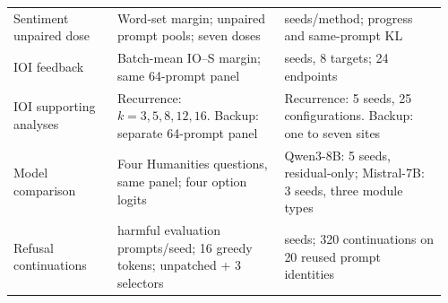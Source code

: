 \begin{longtable}{@{}>{\raggedright\arraybackslash}p{0.23\linewidth}>{\raggedright\arraybackslash}p{0.37\linewidth}>{\raggedright\arraybackslash}p{0.36\linewidth}@{}}
Sentiment unpaired dose & Word-set margin; unpaired prompt pools; seven doses & 3 seeds/method; progress and same-prompt KL \\
IOI feedback & Batch-mean IO--S margin; same 64-prompt panel & 3 seeds, 8 targets; 24 endpoints \\
IOI supporting analyses & Recurrence: $k=3,5,8,12,16$. Backup: separate 64-prompt panel & Recurrence: 5 seeds, 25 configurations. Backup: one to seven sites \\
Model comparison & Four Humanities questions, same panel; four option logits & Qwen3-8B: 5 seeds, residual-only; Mistral-7B: 3 seeds, three module types \\
Refusal continuations & 10 harmful evaluation prompts/seed; 16 greedy tokens; unpatched + 3 selectors & 8 seeds; 320 continuations on 20 reused prompt identities \\
\bottomrule
\end{longtable}
